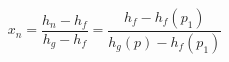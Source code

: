 

\item[c)] \[
    x_n = \frac{h_n - h_f}{h_g - h_f} = \frac{h_f - h_f(p_1)}{h_g(p) - h_f(p_1)}
    \]